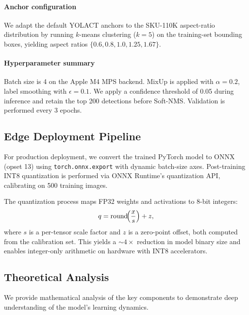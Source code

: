 \documentclass[conference]{IEEEtran}
\begin{document}
\paragraph{Anchor configuration}
We adapt the default YOLACT anchors to the SKU-110K aspect-ratio
distribution by running $k$-means clustering ($k=5$) on the training-set
bounding boxes, yielding aspect ratios $\{0.6, 0.8, 1.0, 1.25, 1.67\}$.

\paragraph{Hyperparameter summary}
Batch size is 4 on the Apple M4 MPS backend. MixUp is applied with
$\alpha=0.2$, label smoothing with $\epsilon=0.1$. We apply a
confidence threshold of 0.05 during inference and retain the top 200
detections before Soft-NMS. Validation is performed every 3 epochs.

\subsection{Edge Deployment Pipeline}
\label{sec:edge}

For production deployment, we convert the trained PyTorch model to ONNX
(opset 13) using \texttt{torch.onnx.export} with dynamic batch-size axes.
Post-training INT8 quantization is performed via ONNX Runtime's
quantization API, calibrating on 500 training images.

The quantization process maps FP32 weights and activations to 8-bit
integers:
\begin{equation}
  q = \text{round}\!\Bigl(\frac{x}{s}\Bigr) + z,
  \label{eq:quant}
\end{equation}
where $s$ is a per-tensor scale factor and $z$ is a zero-point offset,
both computed from the calibration set. This yields a ${\sim}4\times$
reduction in model binary size and enables integer-only arithmetic on
hardware with INT8 accelerators.

\subsection{Theoretical Analysis}
\label{sec:theory}

We provide mathematical analysis of the key components to demonstrate
deep understanding of the model's learning dynamics.
\end{document}

